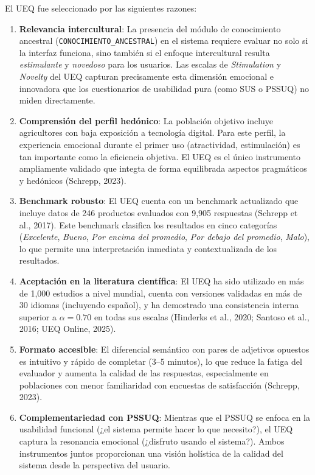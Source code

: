 \documentclass[a4paper,12pt]{report}
\begin{document}
El UEQ fue seleccionado por las siguientes razones:

\begin{enumerate}
    \item \textbf{Relevancia intercultural}: La presencia del módulo de conocimiento ancestral (\texttt{CONOCIMIENTO\_ANCESTRAL}) en el sistema requiere evaluar no solo si la interfaz funciona, sino también si el enfoque intercultural resulta \textit{estimulante} y \textit{novedoso} para los usuarios. Las escalas de \textit{Stimulation} y \textit{Novelty} del UEQ capturan precisamente esta dimensión emocional e innovadora que los cuestionarios de usabilidad pura (como SUS o PSSUQ) no miden directamente.

    \item \textbf{Comprensión del perfil hedónico}: La población objetivo incluye agricultores con baja exposición a tecnología digital. Para este perfil, la experiencia emocional durante el primer uso (atractividad, estimulación) es tan importante como la eficiencia objetiva. El UEQ es el único instrumento ampliamente validado que integta de forma equilibrada aspectos pragmáticos y hedónicos (Schrepp, 2023).

    \item \textbf{Benchmark robusto}: El UEQ cuenta con un benchmark actualizado que incluye datos de 246 productos evaluados con 9,905 respuestas (Schrepp et al., 2017). Este benchmark clasifica los resultados en cinco categorías (\textit{Excelente}, \textit{Bueno}, \textit{Por encima del promedio}, \textit{Por debajo del promedio}, \textit{Malo}), lo que permite una interpretación inmediata y contextualizada de los resultados.

    \item \textbf{Aceptación en la literatura científica}: El UEQ ha sido utilizado en más de 1,000 estudios a nivel mundial, cuenta con versiones validadas en más de 30 idiomas (incluyendo español), y ha demostrado una consistencia interna superior a $\alpha = 0.70$ en todas sus escalas (Hinderks et al., 2020; Santoso et al., 2016; UEQ Online, 2025).

    \item \textbf{Formato accesible}: El diferencial semántico con pares de adjetivos opuestos es intuitivo y rápido de completar (3--5 minutos), lo que reduce la fatiga del evaluador y aumenta la calidad de las respuestas, especialmente en poblaciones con menor familiaridad con encuestas de satisfacción (Schrepp, 2023).

    \item \textbf{Complementariedad con PSSUQ}: Mientras que el PSSUQ se enfoca en la usabilidad funcional (¿el sistema permite hacer lo que necesito?), el UEQ captura la resonancia emocional (¿disfruto usando el sistema?). Ambos instrumentos juntos proporcionan una visión holística de la calidad del sistema desde la perspectiva del usuario.
\end{enumerate}
\end{document}
